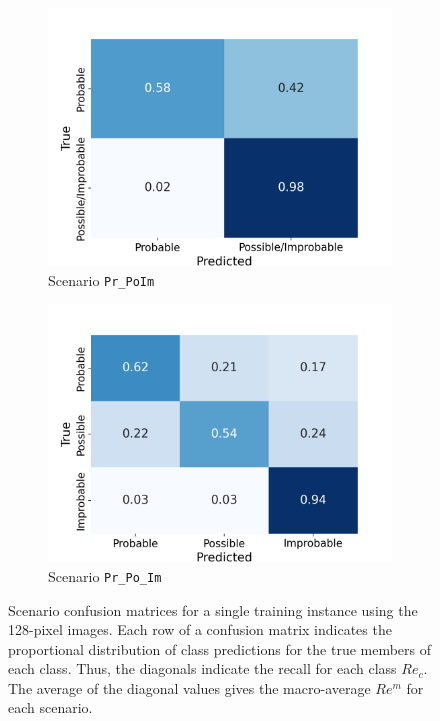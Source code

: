 \documentclass[NewProceedindgs, NoLineNumbers, SectionNumbers, letterpaper, SingleSpace, InsideFigs]{ascelike-new}
\begin{document}
\begin{figure}[ht]
  \begin{subfigure}[t]{.45\linewidth}
    \centering
    \includegraphics[width=\linewidth, trim={0 0 1cm 1cm}, clip]{opt-confusion-matrix-Pr_PoIm-128-px.png}
    \caption{Scenario \texttt{Pr\_PoIm}}
    \label{pr_poim_cm}
\end{subfigure}%
  \begin{subfigure}[t]{.45\linewidth}
    \centering
    \includegraphics[width=\linewidth, trim={0 0 1cm 1cm}, clip]{opt-confusion-matrix-Pr_Po_Im-128-px.png}
    \caption{Scenario \texttt{Pr\_Po\_Im}}
    \label{pr_po_im_cm}
  \end{subfigure}%
  \caption{Scenario confusion matrices for a single training instance using the 128-pixel images.  Each row of a
    confusion matrix indicates the proportional distribution of class predictions for the true members of each
    class. Thus, the diagonals indicate the recall for each class $Re_c$. The average of the diagonal values gives the
    macro-average $Re^m$ for each scenario.}
    \label{fig:confusion-matrix}
  \end{figure}
\end{document}
